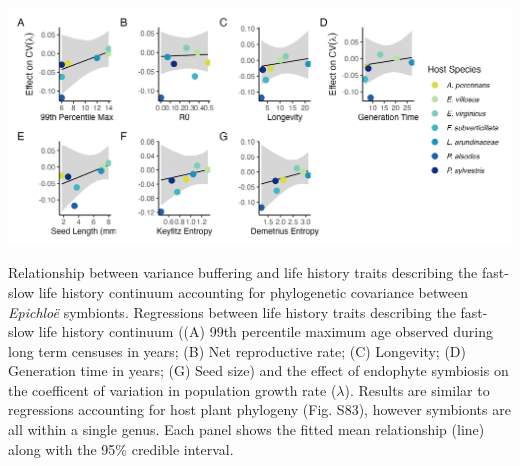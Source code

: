 \documentclass[lineno, sn-basic]{sn-jnl}%
\begin{document}
\begin{myfigure}[H]
	\centering
	\includegraphics[width=\linewidth]{lh_epichloe_plot.png}
	\label{fig:lh_epich}
	\caption[Relationship between variance buffering and life history traits describing the fast-slow life history continuum accounting for phylogenetic covariance between \emph{Epichlo\"{e}} symbionts]{Relationship between variance buffering and life history traits describing the fast-slow life history continuum accounting for phylogenetic covariance between \emph{Epichlo\"{e}} symbionts. Regressions between life history traits describing the fast-slow life history continuum ((A) 99th percentile maximum age observed during long term censuses in years; (B) Net reproductive rate; (C) Longevity; (D) Generation time in years; (G) Seed size) and the effect of endophyte symbiosis on the coefficent of variation in population growth rate ($\lambda$). Results are similar to regressions accounting for host plant phylogeny (Fig. S83), however symbionts are all within a single genus. Each panel shows the fitted mean relationship (line) along with the 95\% credible interval.}
\end{myfigure}
\end{document}
